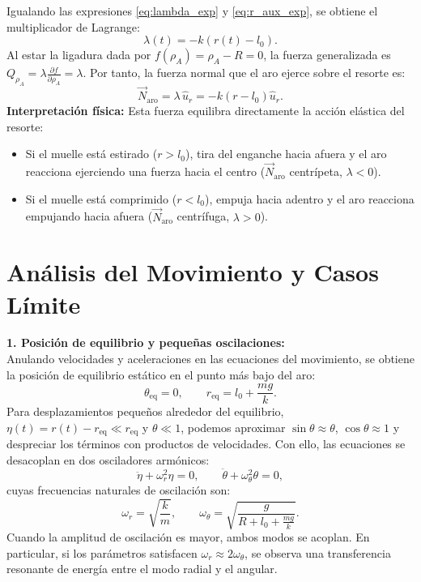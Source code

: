 \documentclass[11pt,a4paper]{article}
\begin{document}
Igualando las expresiones \eqref{eq:lambda_exp} y \eqref{eq:r_aux_exp}, se obtiene el multiplicador de Lagrange:
\begin{equation}
\boxed{\lambda(t) = -k(r(t) - l_0).}
\end{equation}
Al estar la ligadura dada por $f(\rho_A) = \rho_A - R = 0$, la fuerza generalizada es $Q_{\rho_A} = \lambda \frac{\partial f}{\partial \rho_A} = \lambda$. Por tanto, la fuerza normal que el aro ejerce sobre el resorte es:
\begin{equation}
\boxed{\vec{N}_{\text{aro}} = \lambda\,\hat{u}_r = -k(r - l_0)\hat{u}_r.}
\end{equation}
\textbf{Interpretación física:} Esta fuerza equilibra directamente la acción elástica del resorte:
\begin{itemize}
    \item Si el muelle está estirado ($r > l_0$), tira del enganche hacia afuera y el aro reacciona ejerciendo una fuerza hacia el centro ($\vec{N}_{\text{aro}}$ centrípeta, $\lambda < 0$).
    \item Si el muelle está comprimido ($r < l_0$), empuja hacia adentro y el aro reacciona empujando hacia afuera ($\vec{N}_{\text{aro}}$ centrífuga, $\lambda > 0$).
\end{itemize}

\section*{Análisis del Movimiento y Casos Límite}

\textbf{1. Posición de equilibrio y pequeñas oscilaciones:}\\
Anulando velocidades y aceleraciones en las ecuaciones del movimiento, se obtiene la posición de equilibrio estático en el punto más bajo del aro:
\begin{equation}
\theta_{\text{eq}} = 0, \qquad r_{\text{eq}} = l_0 + \frac{mg}{k}.
\end{equation}
Para desplazamientos pequeños alrededor del equilibrio, $\eta(t) = r(t) - r_{\text{eq}} \ll r_{\text{eq}}$ y $\theta \ll 1$, podemos aproximar $\sin\theta \approx \theta$, $\cos\theta \approx 1$ y despreciar los términos con productos de velocidades. Con ello, las ecuaciones se desacoplan en dos osciladores armónicos:
\begin{equation}
\ddot{\eta} + \omega_r^2 \eta = 0, \qquad \ddot{\theta} + \omega_\theta^2 \theta = 0,
\end{equation}
cuyas frecuencias naturales de oscilación son:
\begin{equation}
\boxed{\omega_r = \sqrt{\frac{k}{m}}, \qquad \omega_\theta = \sqrt{\frac{g}{R + l_0 + \frac{mg}{k}}}.}
\end{equation}
Cuando la amplitud de oscilación es mayor, ambos modos se acoplan. En particular, si los parámetros satisfacen $\omega_r \approx 2\omega_\theta$, se observa una transferencia resonante de energía entre el modo radial y el angular.
\end{document}
